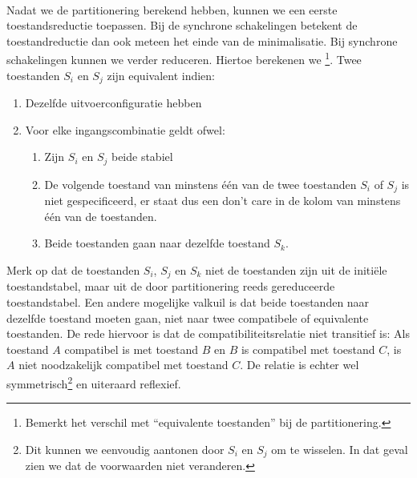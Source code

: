 \paragraph{}
Nadat we de partitionering berekend hebben, kunnen we een eerste toestandsreductie toepassen. Bij de synchrone schakelingen betekent de toestandreductie dan ook meteen het einde van de minimalisatie. Bij synchrone schakelingen kunnen we verder reduceren. Hiertoe berekenen we \footnote{Bemerkt het verschil met ``equivalente toestanden'' bij de partitionering.}. Twee toestanden $S_i$ en $S_j$ zijn equivalent indien:
\begin{enumerate}
 \item Dezelfde uitvoerconfiguratie hebben
 \item Voor elke ingangscombinatie geldt ofwel:
 \begin{enumerate}
  \item Zijn $S_i$ en $S_j$ beide stabiel
  \item De volgende toestand van minstens \'e\'en van de twee toestanden $S_i$ of $S_j$ is niet gespecificeerd, er staat dus een don't care in de kolom van minstens \'e\'en van de toestanden.
  \item Beide toestanden gaan naar dezelfde toestand $S_k$.
 \end{enumerate}
\end{enumerate}
Merk op dat de toestanden $S_i$, $S_j$ en $S_k$ niet de toestanden zijn uit de initi\"ele toestandstabel, maar uit de door partitionering reeds gereduceerde toestandstabel. Een andere mogelijke valkuil is dat beide toestanden naar dezelfde toestand moeten gaan, niet naar twee compatibele of equivalente toestanden. De rede hiervoor is dat de compatibiliteitsrelatie niet transitief is: Als toestand $A$ compatibel is met toestand $B$ en $B$ is compatibel met toestand $C$, is $A$ niet noodzakelijk compatibel met toestand $C$. De relatie is echter wel symmetrisch\footnote{Dit kunnen we eenvoudig aantonen door $S_i$ en $S_j$ om te wisselen. In dat geval zien we dat de voorwaarden niet veranderen.} en uiteraard reflexief.
